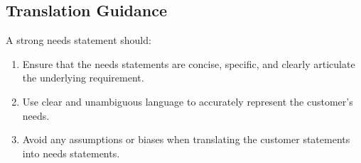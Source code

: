 \subsection{Translation Guidance}
\label{sec:Translation_guidance}
A strong needs statement should:
    \begin{enumerate}
        \item Ensure that the needs statements are concise, specific, and clearly articulate the underlying requirement.
        \item Use clear and unambiguous language to accurately represent the customer's needs.
        \item Avoid any assumptions or biases when translating the customer statements into needs statements.
    \end{enumerate}



